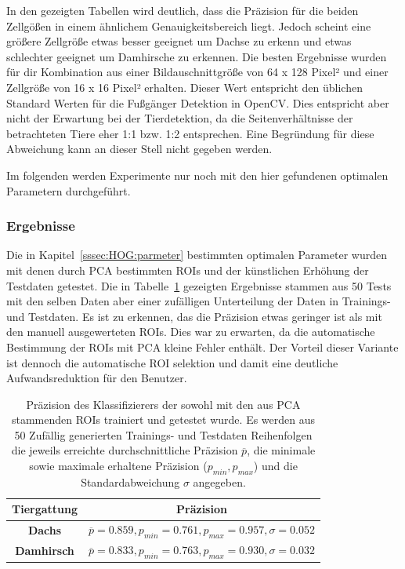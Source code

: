 In den gezeigten Tabellen wird deutlich, dass die Präzision für die beiden Zellgößen in einem ähnlichem Genauigkeitsbereich liegt. Jedoch scheint eine größere Zellgröße etwas besser geeignet um Dachse zu erkenn und etwas schlechter geeignet um Damhirsche zu erkennen. Die besten Ergebnisse wurden für dir Kombination aus einer Bildauschnittgröße von 64 x 128 Pixel² und einer Zellgröße von 16 x 16 Pixel² erhalten. Dieser Wert entspricht den üblichen Standard Werten für die Fußgänger Detektion in OpenCV. Dies entspricht aber nicht der Erwartung bei der Tierdetektion, da die Seitenverhältnisse der betrachteten Tiere eher 1:1 bzw. 1:2 entsprechen. Eine Begründung für diese Abweichung kann an dieser Stell nicht gegeben werden. 

Im folgenden werden Experimente nur noch mit den hier gefundenen optimalen Parametern durchgeführt.

\subsubsection{Ergebnisse}
Die in Kapitel~\ref{sssec:HOG:parmeter} bestimmten optimalen Parameter wurden mit denen durch PCA bestimmten ROIs und der künstlichen Erhöhung der Testdaten getestet. Die in Tabelle~\ref{tab:HOG:ResultsAuto} gezeigten Ergebnisse stammen aus 50 Tests mit den selben Daten aber einer zufälligen Unterteilung der Daten in Trainings- und Testdaten. Es ist zu erkennen, das die Präzision etwas geringer ist als mit den manuell ausgewerteten ROIs. Dies war zu erwarten, da die automatische Bestimmung der ROIs mit PCA kleine Fehler enthält. Der Vorteil dieser Variante ist dennoch die automatische ROI selektion und damit eine deutliche Aufwandsreduktion für den Benutzer. 

\begin{table}[]
\centering
\caption{Präzision des Klassifizierers der sowohl mit den aus PCA stammenden ROIs trainiert und getestet wurde. Es werden aus 50 Zufällig generierten Trainings- und Testdaten Reihenfolgen die jeweils erreichte durchschnittliche Präzision $\overline{p}$, die minimale sowie maximale erhaltene Präzision ($p_{min}, p_{max}$) und die Standardabweichung $\sigma$ angegeben. }
 \label{tab:HOG:ResultsAuto}
\begin{tabular}{cl}
\hline
\textbf{Tiergattung} 	       & \multicolumn{1}{c}{\textbf{Präzision}}                                                                                                                                                  \\ \hline
\textbf{Dachs}                         &$\overline{p}= 0.859, p_{min}=0.761, p_{max}=0.957, \sigma=0.052$ \\
\textbf{Damhirsch}                &$\overline{p}=0.833, p_{min}=0.763, p_{max}=0.930, \sigma=0.032$ \\
\hline
\end{tabular}
\end{table}


